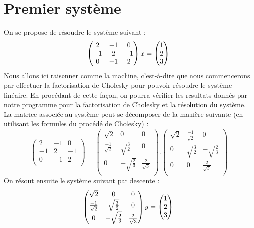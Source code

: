 \documentclass[a4paper, titlepage]{livret}													%
\begin{document}
	\section{Premier système}
		On se propose de résoudre le système suivant :
			\[
				\begin{pmatrix}
					2 & -1 & 0 \\
					-1 & 2 & -1 \\
					0 & -1 & 2 \\
				\end{pmatrix}
				x =
				\begin{pmatrix}
					1 \\
					2 \\
					3 \\
				\end{pmatrix} \\
			\]
		Nous allons ici raisonner comme la machine, c'est-à-dire que nous commencerons par effectuer la factorisation de Cholesky pour pouvoir résoudre le système linéaire. En procédant de cette façon, on pourra vérifier les résultats donnés par notre programme pour la factorisation de Cholesky et la résolution du système.
		La matrice associée au système peut se décomposer de la manière suivante (en utilisant les formules du procédé de Cholesky) :
			\[
				\begin{pmatrix}
					2 & -1 & 0 \\
					-1 & 2 & -1 \\
					0 & -1 & 2 \\
				\end{pmatrix}
				=
				\begin{pmatrix}
					\sqrt{2} & 0 & 0 \\
					\frac{-1}{\sqrt{2}} & \sqrt{\frac{3}{2}} & 0 \\
					0 & -\sqrt{\frac{2}{3}} & \frac{2}{\sqrt{3}} \\
				\end{pmatrix} .
				\begin{pmatrix}
					\sqrt{2} & \frac{-1}{\sqrt{2}} & 0 \\
					0 & \sqrt{\frac{3}{2}} & -\sqrt{\frac{2}{3}}\\
					0 & 0 & \frac{2}{\sqrt{3}} \\
				\end{pmatrix}
			\]
		On résout ensuite le système suivant par descente :
			\[
				\begin{pmatrix}
					\sqrt{2} & 0 & 0 \\
					\frac{-1}{\sqrt{2}} & \sqrt{\frac{3}{2}} & 0 \\
					0 & -\sqrt{\frac{2}{3}} & \frac{2}{\sqrt{3}} \\
				\end{pmatrix}
				y =
				\begin{pmatrix}
					1 \\
					2 \\
					3 \\
				\end{pmatrix} \\
			\]
\end{document}
